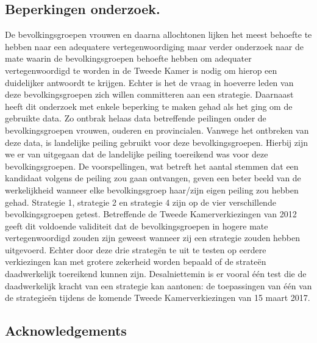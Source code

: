 \subsection*{Beperkingen onderzoek.}
De bevolkingsgroepen vrouwen en daarna allochtonen lijken het meest behoefte te hebben naar een adequatere vertegenwoordiging maar verder onderzoek naar de mate waarin de bevolkingsgroepen behoefte hebben om adequater vertegenwoordigd te worden in de Tweede Kamer is nodig om hierop een duidelijker antwoordt te krijgen. Echter is het de vraag in hoeverre leden van deze bevolkingsgroepen zich willen committeren aan een strategie. Daarnaast heeft dit onderzoek met enkele beperking te maken gehad als het ging om de gebruikte data. Zo ontbrak helaas data betreffende peilingen onder de bevolkingsgroepen vrouwen, ouderen en provincialen. Vanwege het ontbreken van deze data, is landelijke peiling gebruikt voor deze bevolkingsgroepen. Hierbij zijn we er van uitgegaan dat de landelijke peiling toereikend was voor deze bevolkingsgroepen. De voorspellingen, wat betreft het aantal stemmen dat een kandidaat volgens de peiling zou gaan ontvangen, geven een beter beeld van de werkelijkheid wanneer elke bevolkingsgroep haar/zijn eigen peiling zou hebben gehad. Strategie 1, strategie 2 en strategie 4 zijn op de vier verschillende bevolkingsgroepen getest. Betreffende de Tweede Kamerverkiezingen van 2012 geeft dit voldoende validiteit dat de bevolkingsgroepen in hogere mate vertegenwoordigd zouden zijn geweest wanneer zij een strategie zouden hebben uitgevoerd. Echter door deze drie strateg\"{e}n te uit te testen op eerdere verkiezingen kan met grotere zekerheid worden bepaald of de strate\"{e}n daadwerkelijk toereikend kunnen zijn. Desalniettemin is er vooral één test die de daadwerkelijk kracht van een strategie kan aantonen: de toepassingen van één van de strategie\"{e}n tijdens de komende Tweede Kamerverkiezingen van 15 maart 2017.


\subsection{Acknowledgements}




























